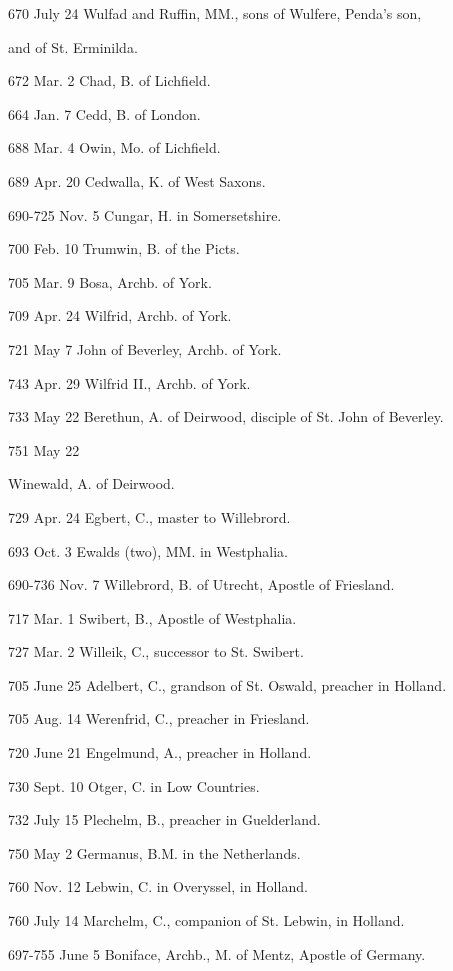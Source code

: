 
670 July
24
Wulfad
and Ruffin, MM., sons of Wulfere, Penda's son,

and of St.
Erminilda.

672 Mar.
2
Chad,
B. of Lichfield.

664 Jan.
7
Cedd, B. of London.

688 Mar.
4
Owin, Mo. of Lichfield.

689 Apr.
20
Cedwalla, K. of West Saxons.

690-725 Nov.
5
Cungar,
H. in Somersetshire.

700 Feb.
10
Trumwin, B. of the Picts.

705 Mar.
9
Bosa, Archb. of York.

709 Apr.
24
Wilfrid, Archb. of York.

721 May
7
John of Beverley, Archb. of York.

743 Apr.
29
Wilfrid II., Archb. of York.

733 May
22
Berethun, A. of Deirwood, disciple of St. John of Beverley.

751 May
22

Winewald, A. of Deirwood.


729 Apr.
24
Egbert,
C., master to Willebrord.

693 Oct.
3
Ewalds (two), MM. in Westphalia.

690-736 Nov.
7
Willebrord,
B. of Utrecht, Apostle of Friesland.

717 Mar.
1
Swibert, B., Apostle of Westphalia.

727 Mar.
2
Willeik, C., successor to St. Swibert.

705 June
25
Adelbert, C., grandson of St. Oswald, preacher in Holland.

705 Aug.
14
Werenfrid, C., preacher in Friesland.

720 June
21
Engelmund, A., preacher in Holland.

730 Sept.
10
Otger, C. in Low Countries.

732 July
15
Plechelm, B., preacher in Guelderland.

750 May
2
Germanus, B.M. in the Netherlands.

760 Nov.
12
Lebwin, C. in Overyssel, in Holland.

760 July
14
Marchelm, C., companion of St. Lebwin, in Holland.

697-755 June
5
Boniface,
Archb., M. of Mentz, Apostle of Germany.

